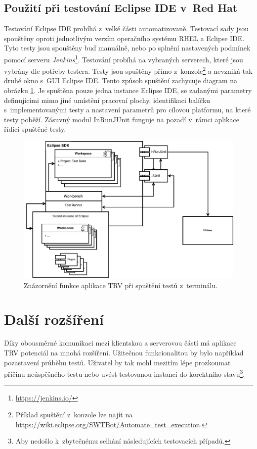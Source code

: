     \subsection{Použití při testování Eclipse IDE v~Red Hat}
    Testování Eclipse IDE probíhá z~velké části automatizovaně. Testovací sady jsou spouštěny oproti jednotlivým verzím operačního systému RHEL a Eclipse IDE. Tyto testy jsou spouštěny buď manuálně, nebo po splnění nastavených podmínek pomocí serveru \emph{Jenkins}\footnote{\url{https://jenkins.io/}}. Testování probíhá na vybraných serverech, které jsou vybrány dle potřeby testera. Testy jsou spuštěny přímo z~konzole\footnote{Příklad spuštění z~konzole lze najít na \url{https://wiki.eclipse.org/SWTBot/Automate_test_execution}.} a nevzniká tak druhé okno s~GUI Eclipse IDE. Tento způsob spuštění zachycuje diagram na obrázku \ref{fig:TRV_run_from_term}. Je spuštěna pouze jedna instance Eclipse IDE, se zadanými parametry definujícími mimo jiné umístění pracovní plochy, identifikaci balíčku s~implementovanými testy a nastavení parametrů pro cílovou platformu, na které testy poběží. Zásuvný modul InRunJUnit funguje na pozadí v~rámci aplikace řídící spuštěné testy.

    \begin{figure}
	\includegraphics[width=\textwidth, center]{obrazky-figures/TRV_run_from_term.pdf}
	\caption{Znázornění funkce aplikace TRV při spuštění testů z~terminálu.}
	\label{fig:TRV_run_from_term}
      \end{figure}

  \section{Další rozšíření}
  Díky obousměrné komunikaci mezi klientskou a serverovou částí má aplikace TRV potenciál na mnohá rozšíření. Užitečnou funkcionalitou by bylo například pozastavení průběhu testů. Uživatel by tak mohl mezitím lépe prozkoumat příčinu neúspěšného testu nebo uvést testovanou instanci do korektního stavu\footnote{Aby nedošlo k~zbytečnému selhání následujících testovacích případů.}. 
  
